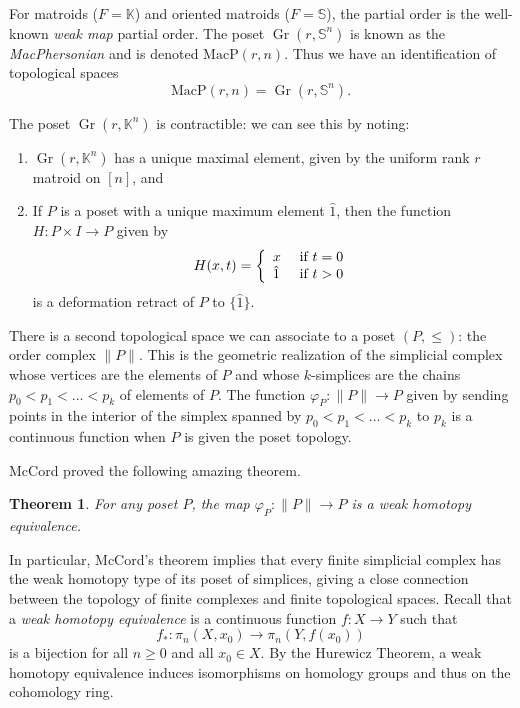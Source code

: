\documentclass[10pt, preprint]{article}
\newtheorem{theorem}{Theorem}[section]
\theoremstyle{definition}
\begin{document}
For matroids ($F = \mathbb{K}$) and oriented matroids ($F =
\mathbb{S}$), the partial order is the well-known \emph{weak map} partial
order. The poset $\operatorname{Gr}(r, \mathbb{S}^{n})$ is known as the
\emph{MacPhersonian} and is denoted $\mathrm{MacP}(r,n)$. Thus we have
an identification of topological spaces
%
\begin{equation*}
\mathrm{MacP}(r,n) = \operatorname{Gr}(r, \mathbb{S}^{n}).
\end{equation*}

The poset $\operatorname{Gr}(r, \mathbb{K}^{n})$ is contractible: we can
see this by noting:
%
\begin{enumerate}%
\item
$\operatorname{Gr}(r, \mathbb{K}^{n})$ has a unique maximal element,
given by the uniform rank $r$ matroid on $[n]$, and
%
\item
If $P$ is a poset with a unique maximum element $\hat{1}$, then the
function $H:P\times I\to P$ given by
%
\begin{equation*}
H(x,t)=\left \{
%
\begin{array}{l@{\quad }l}
x&\mbox{ if $t=0$}
\\
\hat{1}&\mbox{ if $t>0$}
\end{array}
%
\right .
\end{equation*}
%
is a deformation retract of $P$ to $\{\hat{1}\}$.
\end{enumerate}

There is a second topological space we can associate to a poset
$(P,\leq )$: the order complex $\|P\|$. This is the geometric
realization of the simplicial complex whose vertices are the elements
of $P$ and whose $k$-simplices are the chains $p_{0} < p_{1} < \dots
< p_{k}$ of elements of $P$. The function $\varphi _{P}: \|P\| \to P$
given by sending points in the interior of the simplex spanned by
$p_{0} < p_{1} < \dots < p_{k}$ to $p_{k}$ is a continuous function when
$P$ is given the poset topology.

McCord \cite{mccord} proved the following amazing theorem.

\begin{theorem}
For any poset $P$, the map $\varphi _{P} : \|P\| \to P$ is a weak
homotopy equivalence.
\end{theorem}

In particular, McCord's theorem implies that every finite simplicial
complex has the weak homotopy type of its poset of simplices, giving
a close connection between the topology of finite complexes and finite
topological spaces. Recall that a \emph{weak homotopy equivalence} is a
continuous function $f : X \to Y$ such that
%
\begin{equation*}
f_{*} : \pi _{n}(X,x_{0}) \to \pi _{n}(Y,f(x_{0}))
\end{equation*}
%
is a bijection for all $n \geq 0$ and all $x_{0} \in X$. By the Hurewicz
Theorem, a weak homotopy equivalence induces isomorphisms on homology
groups and thus on the cohomology ring.
\end{document}
